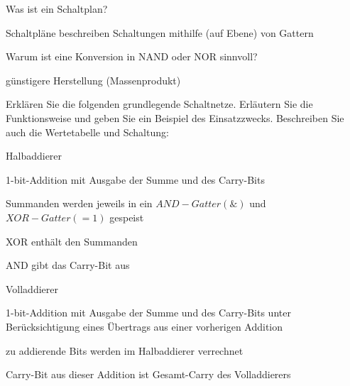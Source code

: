 \documentclass
[
  draft    = true,
  fontsize = 11pt,
  parskip  = half-,
  BCOR     = 0pt,
  DIV      = 11,
  ngerman,
  dvipsnames
]
{scrartcl}
\begin{document}
\begin{mytemize}
  \item Was ist ein Schaltplan?
        \begin{achim}
          \begin{mytemize}
            \item Schaltpläne beschreiben Schaltungen mithilfe (auf Ebene) von Gattern
          \end{mytemize}
        \end{achim}
  \item Warum ist eine Konversion in NAND oder NOR sinnvoll?
        \begin{achim}
          \begin{mytemize}
            \item günstigere Herstellung (Massenprodukt)
          \end{mytemize}
        \end{achim}
  \item Erklären Sie die folgenden grundlegende Schaltnetze. Erläutern
        Sie die Funktionsweise und geben Sie ein Beispiel des Einsatzzwecks.
        Beschreiben Sie auch die Wertetabelle und Schaltung:
        \begin{mytemize}
          \item Halbaddierer
                \begin{karsten}
                  \begin{mytemize}
                    \item 1-bit-Addition mit Ausgabe der Summe und des Carry-Bits
                    \item Summanden werden jeweils in ein $AND-Gatter(\&)$ und $XOR-Gatter(=1)$ gespeist
                    \item XOR enthält den Summanden
                    \item AND gibt das Carry-Bit aus
                  \end{mytemize}
                \end{karsten}
          \item Volladdierer
                \begin{karsten}
                  \begin{mytemize}
                    \item 1-bit-Addition mit Ausgabe der Summe und des Carry-Bits unter Berücksichtigung eines Übertrags aus einer vorherigen Addition
                    \item zu addierende Bits werden im Halbaddierer verrechnet
                    \item Carry-Bit aus dieser Addition ist Gesamt-Carry des Volladdierers

\end{mytemize}
\end{karsten}
\end{mytemize}
\end{mytemize}
\end{document}
